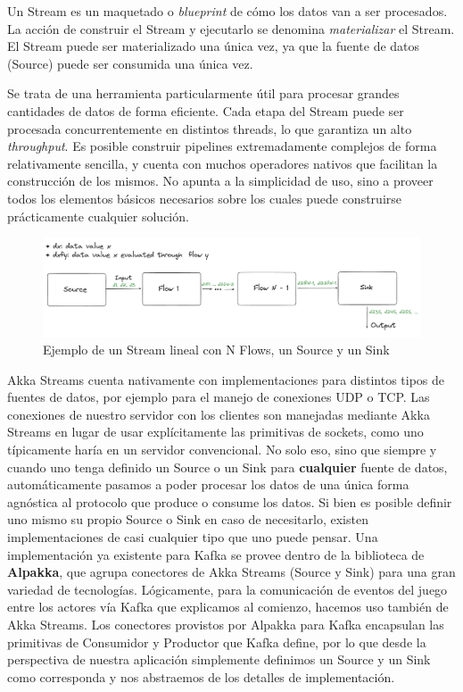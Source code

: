Un Stream es un maquetado o \textit{blueprint} de cómo los datos van a ser procesados. La acción de construir el Stream y ejecutarlo se denomina
\textit{materializar} el Stream. El Stream puede ser materializado una única vez, ya que la fuente de datos (Source) puede ser consumida una única vez.

Se trata de una herramienta particularmente útil para procesar grandes cantidades de datos de forma eficiente. Cada etapa del Stream puede ser procesada
concurrentemente en distintos threads, lo que garantiza un alto \textit{throughput}. Es posible construir pipelines extremadamente complejos de forma relativamente
sencilla, y cuenta con muchos operadores nativos que facilitan la construcción de los mismos. No apunta a la simplicidad de uso, sino a proveer todos los elementos
básicos necesarios sobre los cuales puede construirse prácticamente cualquier solución.

\begin{figure}[htbp]
    \centering
    \includegraphics[width=1.0\textwidth]{../assets/akka-stream-example.png}
    \caption{Ejemplo de un Stream lineal con N Flows, un Source y un Sink}
\end{figure}

Akka Streams cuenta nativamente con implementaciones para distintos tipos de fuentes de datos, por ejemplo para el manejo de conexiones UDP o TCP.
Las conexiones de nuestro servidor con los clientes son manejadas mediante Akka Streams en lugar de usar explícitamente las primitivas de sockets,
como uno típicamente haría en un servidor convencional. No solo eso, sino que siempre y cuando uno tenga definido un Source o un Sink
para \textbf{cualquier} fuente de datos, automáticamente pasamos a poder procesar los datos de una única forma agnóstica al protocolo que produce o consume
los datos. Si bien es posible definir uno mismo su propio Source o Sink en caso de necesitarlo, existen implementaciones de casi cualquier tipo que uno puede
pensar. Una implementación ya existente para Kafka se provee dentro de la biblioteca de \textbf{Alpakka}, que agrupa conectores de Akka Streams (Source y Sink)
para una gran variedad de tecnologías. Lógicamente, para la comunicación de eventos del juego entre los actores vía Kafka que explicamos al comienzo, hacemos
uso también de Akka Streams. Los conectores provistos por Alpakka para Kafka encapsulan las primitivas de Consumidor y Productor que Kafka define,
por lo que desde la perspectiva de nuestra aplicación simplemente definimos un Source y un Sink como corresponda y nos abstraemos de los detalles de implementación.

